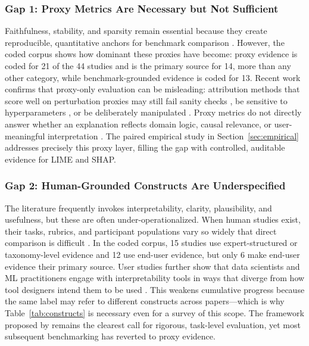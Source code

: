 \documentclass[10pt,a4paper,twoside]{article}
\begin{document}
\subsubsection{Gap 1: Proxy Metrics Are Necessary but Not Sufficient}

Faithfulness, stability, and sparsity remain essential because they create
reproducible, quantitative anchors for benchmark comparison
\citep{agarwal2022openxai,hedstrom2023quantus,canha2025benchmark,
nauta2023anecdotal,burkart2021survey}. However, the coded corpus shows
how dominant these proxies have become: proxy evidence is coded for 21 of the
44 studies and is the primary source for 14, more than any other category,
while benchmark-grounded evidence is coded for 13. Recent work
confirms that proxy-only evaluation can be misleading: attribution
methods that score well on perturbation proxies may still fail sanity
checks \citep{adebayo2018sanity}, be sensitive to hyperparameters
\citep{alvarezmelis2018robustness}, or be deliberately manipulated
\citep{slack2020fooling}. Proxy metrics do not directly answer whether
an explanation reflects domain logic, causal relevance, or
user-meaningful interpretation \citep{kumar2020problems,
doshivelez2017rigorous}. The paired empirical study in
Section~\ref{sec:empirical} addresses precisely this proxy layer,
filling the gap with controlled, auditable evidence for LIME and SHAP.

\subsubsection{Gap 2: Human-Grounded Constructs Are Underspecified}

The literature frequently invokes interpretability, clarity, plausibility,
and usefulness, but these are often under-operationalized. When human
studies exist, their tasks, rubrics, and participant populations vary so
widely that direct comparison is difficult
\citep{ali2023trustworthy,longo2024manifesto,mohseni2021survey}. In the
coded corpus, 15 studies use expert-structured or taxonomy-level evidence and
12 use end-user evidence, but only 6 make end-user evidence their primary
source. User studies further show that data
scientists and ML practitioners engage with interpretability tools in ways
that diverge from how tool designers intend them to be used
\citep{kaur2020interpreting,hase2020evaluating,bucinca2020proxy}. This
weakens cumulative progress because the same label may refer to different
constructs across papers---which is why Table~\ref{tab:constructs} is
necessary even for a survey of this scope. The framework proposed by
\citet{doshivelez2017rigorous} remains the clearest call for rigorous,
task-level evaluation, yet most subsequent benchmarking has reverted to
proxy evidence.
\end{document}
